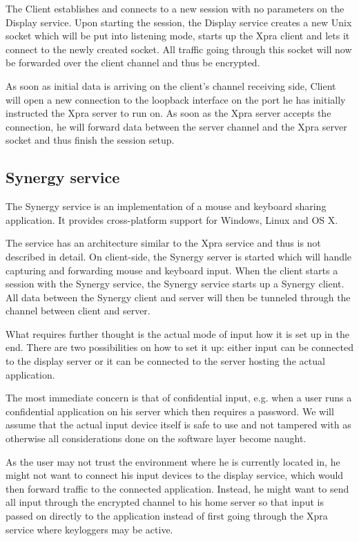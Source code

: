 The Client establishes and connects to a new session with no parameters on the Display service.
Upon starting the session, the Display service creates a new Unix socket which will be put into listening mode, starts up the Xpra client and lets it connect to the newly created socket.
All traffic going through this socket will now be forwarded over the client channel and thus be encrypted.

As soon as initial data is arriving on the client's channel receiving side, Client will open a new connection to the loopback interface on the port he has initially instructed the Xpra server to run on.
As soon as the Xpra server accepts the connection, he will forward data between the server channel and the Xpra server socket and thus finish the session setup.

\subsection{Synergy service}
\label{sec:synergy-service}

The Synergy service is an implementation of a mouse and keyboard sharing application.
It provides cross-platform support for Windows, Linux and OS X.

The service has an architecture similar to the Xpra service and thus is not described in detail.
On client-side, the Synergy server is started which will handle capturing and forwarding mouse and keyboard input.
When the client starts a session with the Synergy service, the Synergy service starts up a Synergy client.
All data between the Synergy client and server will then be tunneled through the channel between client and server.

\medskip

What requires further thought is the actual mode of input how it is set up in the end.
There are two possibilities on how to set it up: either input can be connected to the display server or it can be connected to the server hosting the actual application.

The most immediate concern is that of confidential input, e.g. when a user runs a confidential application on his server which then requires a password.
We will assume that the actual input device itself is safe to use and not tampered with as otherwise all considerations done on the software layer become naught.

As the user may not trust the environment where he is currently located in, he might not want to connect his input devices to the display service, which would then forward traffic to the connected application.
Instead, he might want to send all input through the encrypted channel to his home server so that input is passed on directly to the application instead of first going through the Xpra service where keyloggers may be active.

